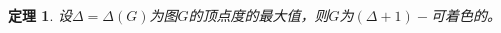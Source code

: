 \documentclass{article}
\begin{document}
\begin{CJK}{UTF8}{gbsn}
  \newtheorem*{Thm}{定理}
  \huge
\begin{Thm}
    设$\Delta = \Delta (G)$为图$G$的顶点度的最大值，则$G$为$(\Delta+1)-$可着色的。  
\end{Thm}


\end{CJK}
\end{document}

